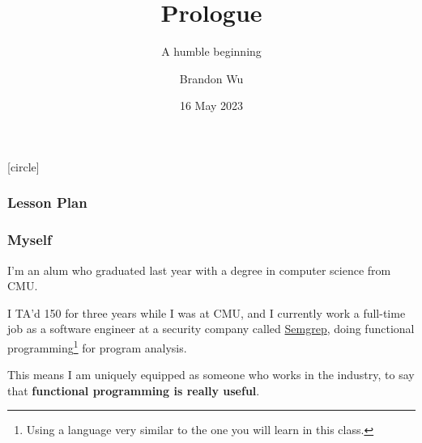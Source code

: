\documentclass[aspectratio=169, handout]{beamer}
\title{Prologue} %
\subtitle{A humble beginning} %
\date{16 May 2023} %
\author{Brandon Wu} %
\newif\ifcolorlambda
\begin{document}
\ifweb
    \renewcommand{\pause}{}
\fi

[circle]

\begin{frame}[plain]
    \colorlambdatrue
    \titlepage
\end{frame}

\begin{comment}
  Future Retro from ANIMUSIC plays as students walk in
  When the music ends, BRANDON bursts in through the door

  HELLO EVERYONE! Welcome to 15-150, Principles of Functional Programming.

  I'm super excited to have all of you here. My name is Brandon Wu, and I'll be your
  primary instructor for this summer. Please call me Brandon, though confusingly
  there is also a TA named Brandon, so I guess we'll have to just figure that one out.

  To properly introduce myself, I'm actually a recent graduate of CMU, I graduated
  with my bachelor's degree in computer science last spring, and when I was in undergrad,
  I TA'd this class five times, and I was Head TA for two semesters. While I am lucky
  enough to teach this course to you this summer, I have a full-time job working
  for a company called Semgrep in the Bay, where I actually do functional programming
  every single day.

  With intros over, let's hop to it. Today we're here to learn functional programming.
\end{comment}

\begin{frame}[fragile]
  \frametitle{Lesson Plan}

  \tableofcontents
\end{frame}


\begin{frame}[fragile]
  \frametitle{Myself}

  I'm an alum who graduated last year with a degree in computer science from CMU.

  \vspace{\fill}

  I TA'd 150 for three years while I was at CMU, and I currently work a
  full-time job as a software engineer at a security company called
  {\color{blue}\href{https://semgrep.dev/}{Semgrep}}, doing functional
  programming\footnote{Using a language very similar to the one you will learn in this class.} for program analysis.

  \vspace{\fill}

  This means I am uniquely equipped as someone who works in the industry, to say that
  \textbf{functional programming is really useful}.

  \vspace{\fill}

\end{frame}
\end{document}
